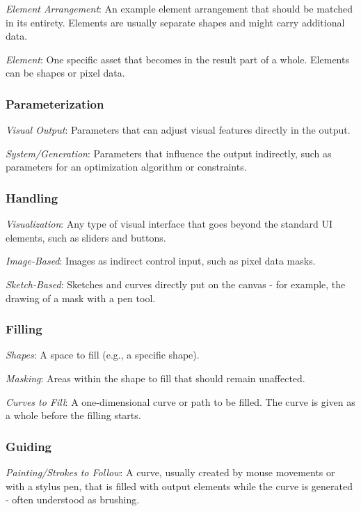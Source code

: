 \textit{Element Arrangement}: An example element arrangement that should be matched in its entirety. Elements are usually separate shapes and might carry additional data.

\textit{Element}: One specific asset that becomes in the result part of a whole. Elements can be shapes or pixel data.


\subsubsection{Parameterization}


\textit{Visual Output}: Parameters that can adjust visual features directly in the output.

\textit{System/Generation}: Parameters that influence the output indirectly, such as parameters for an optimization algorithm or constraints.


\subsubsection{Handling}


\textit{Visualization}: Any type of visual interface that goes beyond the standard UI elements, such as sliders and buttons.

\textit{Image-Based}: Images as indirect control input, such as pixel data masks.

\textit{Sketch-Based}: Sketches and curves directly put on the canvas - for example, the drawing of a mask with a pen tool.


\subsubsection{Filling}


\textit{Shapes}: A space to fill (e.g., a specific shape).

\textit{Masking}: Areas within the shape to fill that should remain unaffected.

\textit{Curves to Fill}: A one-dimensional curve or path to be filled. The curve is given as a whole before the filling starts.


\subsubsection{Guiding}


\textit{Painting/Strokes to Follow}: A curve, usually created by mouse movements or with a stylus pen, that is filled with output elements while the curve is generated - often understood as brushing.


